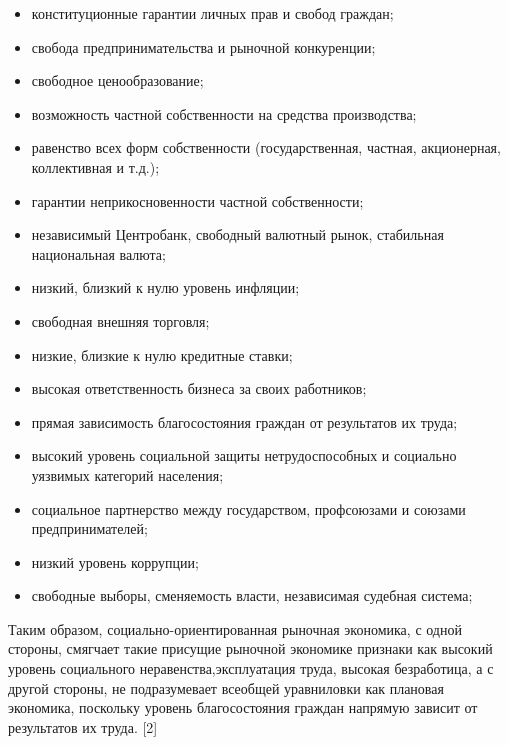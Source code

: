 \documentclass[14pt,a4paper]{article}
\begin{document}
    \begin{itemize}
        \item конституционные гарантии личных прав и свобод граждан;
        \item свобода предпринимательства и рыночной конкуренции;
        \item свободное ценообразование;
        \item возможность частной собственности на средства производства;
        \item равенство всех форм собственности (государственная, частная, акционерная, коллективная и т.д.);
        \item гарантии неприкосновенности частной собственности;
        \item независимый Центробанк, свободный валютный рынок, стабильная национальная валюта;
        \item низкий, близкий к нулю уровень инфляции;
        \item свободная внешняя торговля;
        \item низкие, близкие к нулю кредитные ставки;
        \item высокая ответственность бизнеса за своих работников;
        \item прямая зависимость благосостояния граждан от результатов их труда;
        \item высокий уровень социальной защиты нетрудоспособных и социально уязвимых категорий населения;
        \item социальное партнерство между государством, профсоюзами и союзами предпринимателей;
        \item низкий уровень коррупции;
        \item свободные выборы, сменяемость власти, независимая судебная система;
    \end{itemize}
    \par
    Таким образом, социально-ориентированная рыночная экономика, с одной стороны, смягчает такие присущие рыночной экономике признаки как высокий уровень социального неравенства,эксплуатация труда, высокая безработица, а с другой стороны, не подразумевает всеобщей уравниловки как плановая экономика, поскольку уровень благосостояния граждан напрямую зависит от результатов их труда. [2]
\end{document}
